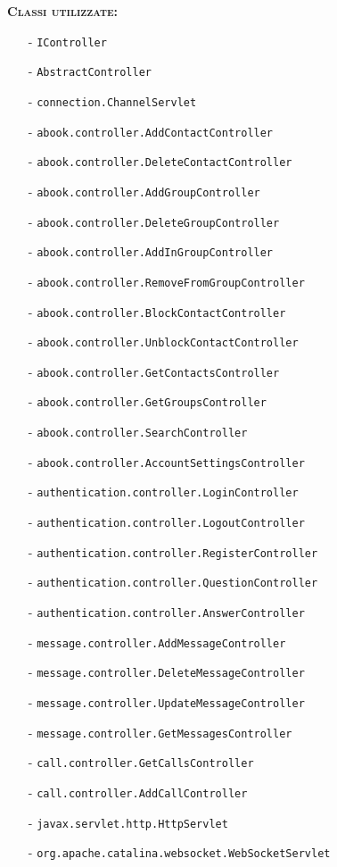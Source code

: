 \begin{description}
	\item{\scshape\bfseries Classi utilizzate:}\\
	\begin{itemize}[noitemsep,nolistsep]
	  \item[-] \texttt{IController}
	  \item[-] \texttt{AbstractController}
	  \item[-] \texttt{connection.ChannelServlet}
	  \item[-] \texttt{abook.controller.AddContactController}
	  \item[-] \texttt{abook.controller.DeleteContactController}
	  \item[-] \texttt{abook.controller.AddGroupController}
	  \item[-] \texttt{abook.controller.DeleteGroupController}
	  \item[-] \texttt{abook.controller.AddInGroupController}
	  \item[-] \texttt{abook.controller.RemoveFromGroupController}
	  \item[-] \texttt{abook.controller.BlockContactController}
	  \item[-] \texttt{abook.controller.UnblockContactController}
	  \item[-] \texttt{abook.controller.GetContactsController}
	  \item[-] \texttt{abook.controller.GetGroupsController}
	  \item[-] \texttt{abook.controller.SearchController}
	  \item[-] \texttt{abook.controller.AccountSettingsController}	  
	  \item[-] \texttt{authentication.controller.LoginController}
	  \item[-] \texttt{authentication.controller.LogoutController}
	  \item[-] \texttt{authentication.controller.RegisterController}
	  \item[-] \texttt{authentication.controller.QuestionController}
	  \item[-] \texttt{authentication.controller.AnswerController}
	  \item[-] \texttt{message.controller.AddMessageController}
	  \item[-] \texttt{message.controller.DeleteMessageController}
	  \item[-] \texttt{message.controller.UpdateMessageController}
	  \item[-] \texttt{message.controller.GetMessagesController}
	  \item[-] \texttt{call.controller.GetCallsController}
	  \item[-] \texttt{call.controller.AddCallController}
	  \item[-] \texttt{javax.servlet.http.HttpServlet}
	  \item[-] \texttt{org.apache.catalina.websocket.WebSocketServlet}
	\end{itemize}
\end{description}

